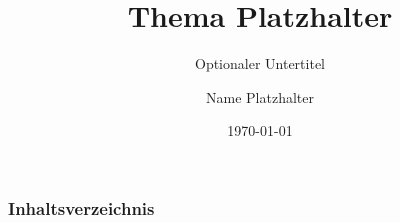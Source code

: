 \documentclass[ngerman]{beamer}
\title{Thema Platzhalter}
\subtitle{Optionaler Untertitel}
\author{Name Platzhalter}
\date{\today}
\begin{document}
    \begin{frame}
        \titlepage
    \end{frame}
    \begin{frame}
        \frametitle{Inhaltsverzeichnis}
        \tableofcontents
    \end{frame}

    
    

    
\end{document}
